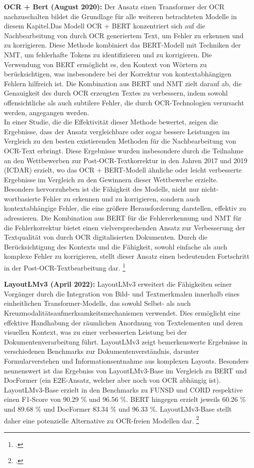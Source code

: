 \textbf{OCR + Bert (August 2020):} Der Ansatz einen Transformer der OCR nachzuschalten bildet die Grundlage für alle weiteren betrachteten Modelle in diesem Kapitel.Das Modell OCR + BERT konzentriert sich auf die Nachbearbeitung von durch OCR generiertem Text, um Fehler zu erkennen und zu korrigieren. Diese Methode kombiniert das \ac{BERT}-Modell mit Techniken der \ac{NMT}, um fehlerhafte Tokens zu identifizieren und zu korrigieren. Die Verwendung von BERT ermöglicht es, den Kontext von Wörtern zu berücksichtigen, was insbesondere bei der Korrektur von kontextabhängigen Fehlern hilfreich ist. Die Kombination aus BERT und NMT zielt darauf ab, die Genauigkeit des durch OCR erzeugten Textes zu verbessern, indem sowohl offensichtliche als auch subtilere Fehler, die durch OCR-Technologien verursacht werden, angegangen werden.\\
In einer Studie, die die Effektivität dieser Methode bewertet, zeigen die Ergebnisse, dass der Ansatz vergleichbare oder sogar bessere Leistungen im Vergleich zu den besten existierenden Methoden für die Nachbearbeitung von OCR-Text erbringt. Diese Ergebnisse wurden insbesondere durch die Teilnahme an den Wettbewerben zur Post-OCR-Textkorrektur in den Jahren 2017 und 2019 (ICDAR) erzielt, wo das OCR + BERT-Modell ähnliche oder leicht verbesserte Ergebnisse im Vergleich zu den Gewinnern dieser Wettbewerbe erzielte. Besonders hervorzuheben ist die Fähigkeit des Modells, nicht nur nicht-wortbasierte Fehler zu erkennen und zu korrigieren, sondern auch kontextabhängige Fehler, die eine größere Herausforderung darstellen, effektiv zu adressieren. Die Kombination aus BERT für die Fehlererkennung und NMT für die Fehlerkorrektur bietet einen vielversprechenden Ansatz zur Verbesserung der Textqualität von durch OCR digitalisierten Dokumenten. Durch die Berücksichtigung des Kontexts und die Fähigkeit, sowohl einfache als auch komplexe Fehler zu korrigieren, stellt dieser Ansatz einen bedeutenden Fortschritt in der Post-OCR-Textbearbeitung dar. \footcites[Vgl. dazu ausführlich][S. 335 ff.]{nguyen_neural_2020}

\textbf{LayoutLMv3 (April 2022):} LayoutLMv3 erweitert die Fähigkeiten seiner Vorgänger durch die Integration von Bild- und Textmerkmalen innerhalb eines einheitlichen Transformer-Modells, das sowohl Selbst- als auch Kreuzmodalitätsaufmerksamkeitsmechanismen verwendet. Dies ermöglicht eine effektive Handhabung der räumlichen Anordnung von Textelementen und deren visuellen Kontext, was zu einer verbesserten Leistung bei der Dokumentenverarbeitung führt. LayoutLMv3 zeigt bemerkenswerte Ergebnisse in verschiedenen Benchmarks zur Dokumentenverständnis, darunter Formularverstehen und Informationsentnahme aus komplexen Layouts. Besonders nennenswert ist das Ergebniss von LayoutLMv3-Base im Vergleich zu BERT und DocFormer (ein E2E-Ansatz, welcher aber noch von OCR abhängig ist). LayoutLMv3-Base erzielt in den Benchmarks zu \ac{FUNSD} und \ac{CORD} respektive einen F1-Score von 90.29 \% und 96.56 \%. BERT hingegen erzielt jeweils 60.26 \% und 89.68 \% und DocFormer 83.34 \% und 96.33 \%. LayoutLMv3-Base stellt daher eine potenzielle Alternative zu OCR-freien Modellen dar. \footcites[Vgl. dazu ausführlich][S. 4087 ff.]{huang_layoutlmv3_2022}

